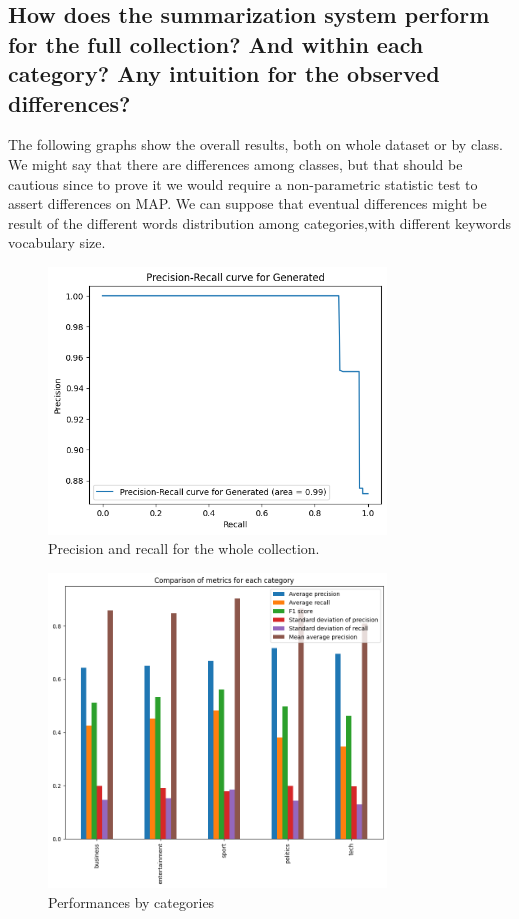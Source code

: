 \subsection{How does the summarization system perform for the full collection? And within each category? Any intuition for the observed differences?}
The following graphs show the overall results, both on whole dataset or by class. \\
We might say that there are differences among classes, but that should be cautious since to prove it we would require a non-parametric statistic test to assert differences on MAP. We can suppose that eventual differences might be result of the different words distribution among categories,with different keywords vocabulary size. 
\begin{figure}[H]
    \centering
    \includegraphics[width=0.8\textwidth]{images/whole_collection_performance.png}
    \caption{Precision and recall for the whole collection.}
    \label{fig:Performances_whole}
\end{figure}

\begin{figure}[H]
    \centering
    \includegraphics[width=0.8\textwidth]{images/class_comparison.png}
    \caption{Performances by categories}
    \label{fig:Performances_cat}
\end{figure}

